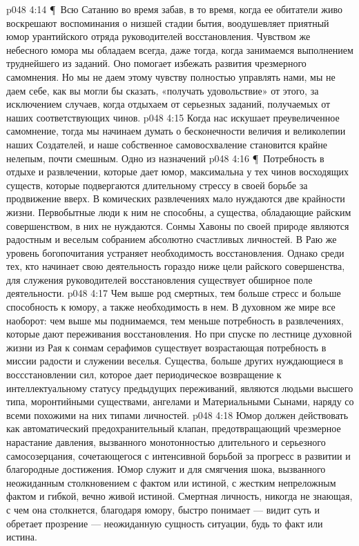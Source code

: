 \vs p048 4:14 \P\ Всю Сатанию во время забав, в то время, когда ее обитатели живо воскрешают воспоминания о низшей стадии бытия, воодушевляет приятный юмор урантийского отряда руководителей восстановления. Чувством же небесного юмора мы обладаем всегда, даже тогда, когда занимаемся выполнением труднейшего из заданий. Оно помогает избежать развития чрезмерного самомнения. Но мы не даем этому чувству полностью управлять нами, мы не даем себе, как вы могли бы сказать, «получать удовольствие» от этого, за исключением случаев, когда отдыхаем от серьезных заданий, получаемых от наших соответствующих чинов.
\vs p048 4:15 Когда нас искушает преувеличенное самомнение, тогда мы начинаем думать о бесконечности величия и великолепии наших Создателей, и наше собственное самовосхваление становится крайне нелепым, почти смешным. Одно из назначений 
\vs p048 4:16 \P\ Потребность в отдыхе и развлечении, которые дает юмор, максимальна у тех чинов восходящих существ, которые подвергаются длительному стрессу в своей борьбе за продвижение вверх. В комических развлечениях мало нуждаются две крайности жизни. Первобытные люди к ним не способны, а существа, обладающие райским совершенством, в них не нуждаются. Сонмы Хавоны по своей природе являются радостным и веселым собранием абсолютно счастливых личностей. В Раю же уровень богопочитания устраняет необходимость восстановления. Однако среди тех, кто начинает свою деятельность гораздо ниже цели райского совершенства, для служения руководителей восстановления существует обширное поле деятельности.
\vs p048 4:17 Чем выше род смертных, тем больше стресс и больше способность к юмору, а также необходимость в нем. В духовном же мире все наоборот: чем выше мы поднимаемся, тем меньше потребность в развлечениях, которые дают переживания восстановления. Но при спуске по лестнице духовной жизни из Рая к сонмам серафимов существует возрастающая потребность в миссии радости и служении веселья. Существа, больше других нуждающиеся в воссстановлении сил, которое дает периодическое возвращение к интеллектуальному статусу предыдущих переживаний, являются людьми высшего типа, моронтийными существами, ангелами и Материальными Сынами, наряду со всеми похожими на них типами личностей.
\vs p048 4:18 Юмор должен действовать как автоматический предохранительный клапан, предотвращающий чрезмерное нарастание давления, вызванного монотонностью длительного и серьезного самосозерцания, сочетающегося с интенсивной борьбой за прогресс в развитии и благородные достижения. Юмор служит и для смягчения шока, вызванного неожиданным столкновением с фактом или истиной, с жестким непреложным фактом и гибкой, вечно живой истиной. Смертная личность, никогда не знающая, с чем она столкнется, благодаря юмору, быстро понимает --- видит суть и обретает прозрение --- неожиданную сущность ситуации, будь то факт или истина.

